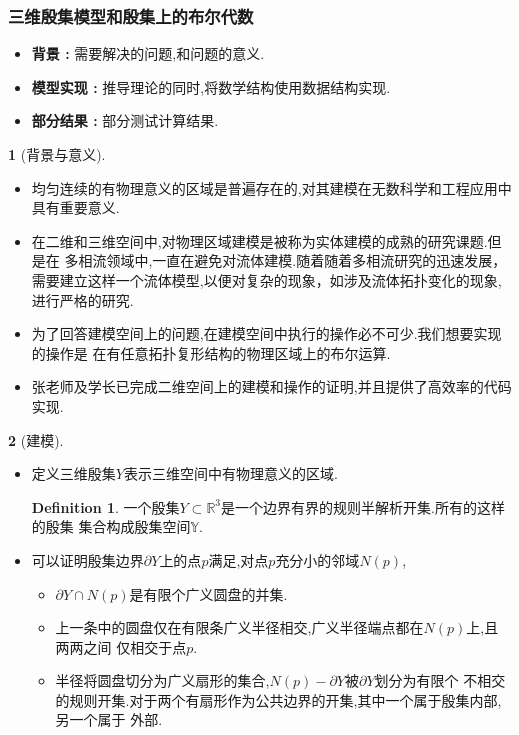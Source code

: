 \documentclass[UTF8]{ctexbeamer}	%
\theoremstyle{plain}
\theoremstyle{definition}
\newtheorem{emt}{}[section]
\newtheorem{defn}{Definition}[section]
\theoremstyle{remark}
\numberwithin{equation}{section}
\begin{document}
\begin{frame}
    \frametitle{三维殷集模型和殷集上的布尔代数}
    \begin{itemize}
        \setlength{\itemsep}{30pt}
        \item \textbf{背景 : } 需要解决的问题,和问题的意义.
        \item \textbf{模型实现 : } 推导理论的同时,将数学结构使用数据结构实现.
        \item  \textbf{部分结果 : } 部分测试计算结果.
    \end{itemize}
\end{frame}

\begin{frame}
    \begin{emt}[背景与意义\cite{2020Boolean}]
        \begin{itemize}
            \item 均匀连续的有物理意义的区域是普遍存在的,对其建模在无数科学和工程应用中具有重要意义.
            \item 在二维和三维空间中,对物理区域建模是被称为实体建模的成熟的研究课题.但是在
            多相流领域中,一直在避免对流体建模.随着随着多相流研究的迅速发展，
            需要建立这样一个流体模型,以便对复杂的现象，如涉及流体拓扑变化的现象,进行严格的研究.
            \item 为了回答建模空间上的问题,在建模空间中执行的操作必不可少.我们想要实现的操作是
            在有任意拓扑复形结构的物理区域上的布尔运算.
            \item 张老师及学长已完成二维空间上的建模和操作的证明,并且提供了高效率的代码实现.
        \end{itemize}
    \end{emt}
\end{frame}

\begin{frame}
    \begin{emt}[建模]
        \begin{itemize}
        \item 定义三维殷集$Y$表示三维空间中有物理意义的区域.
         \begin{defn}
             一个殷集$Y \subset \mathbb{R}^3$是一个边界有界的规则半解析开集.所有的这样的殷集
             集合构成殷集空间$\mathbb{Y}$.
         \end{defn}
        \item 可以证明殷集边界$\partial Y$上的点$p$满足,对点$p$充分小的邻域$N(p)$,
        \begin{itemize}
            \item $\partial Y \cap N(p)$是有限个广义圆盘的并集.
            \item 上一条中的圆盘仅在有限条广义半径相交,广义半径端点都在$N(p)$上,且两两之间
            仅相交于点$p$.
            \item 半径将圆盘切分为广义扇形的集合,$N(p) - \partial Y$被$\partial Y$划分为有限个
            不相交的规则开集.对于两个有扇形作为公共边界的开集,其中一个属于殷集内部,另一个属于
            外部.
        \end{itemize}
        \end{itemize}
    \end{emt}
\end{frame}
\end{document}
